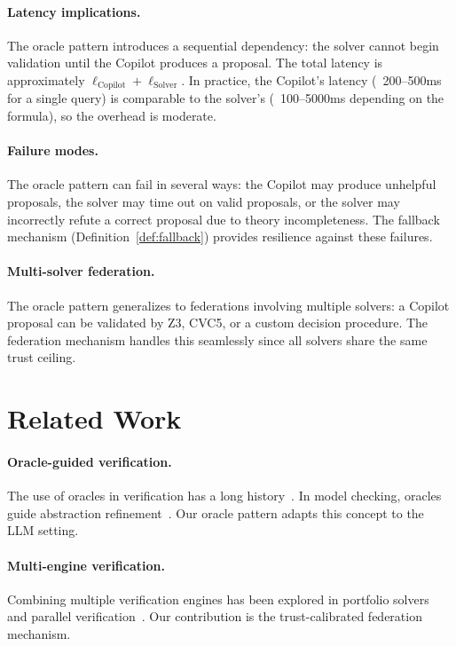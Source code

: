 \documentclass[11pt]{article}
\begin{document}
\paragraph{Latency implications.}
The oracle pattern introduces a sequential dependency: the solver
cannot begin validation until the Copilot produces a proposal.
The total latency is approximately $\ell_{\mathrm{Copilot}} +
\ell_{\mathrm{Solver}}$.  In practice, the Copilot's latency
(~200--500ms for a single query) is comparable to the solver's
(~100--5000ms depending on the formula), so the overhead is
moderate.

\paragraph{Failure modes.}
The oracle pattern can fail in several ways: the Copilot may
produce unhelpful proposals, the solver may time out on valid
proposals, or the solver may incorrectly refute a correct proposal
due to theory incompleteness.  The fallback mechanism
(Definition~\ref{def:fallback}) provides resilience against
these failures.

\paragraph{Multi-solver federation.}
The oracle pattern generalizes to federations involving multiple
solvers: a Copilot proposal can be validated by Z3, CVC5, or a
custom decision procedure.  The federation mechanism handles this
seamlessly since all solvers share the same trust ceiling.

\section{Related Work}
\label{sec:related}

\paragraph{Oracle-guided verification.}
The use of oracles in verification has a long
history~\cite{hoare1969axiomatic,floyd1967assigning}.
In model checking, oracles guide abstraction
refinement~\cite{clarke2003counterexample}.  Our oracle pattern
adapts this concept to the LLM setting.

\paragraph{Multi-engine verification.}
Combining multiple verification engines has been explored in
portfolio solvers~\cite{xu2008satzilla} and parallel
verification~\cite{wintersteiger2009portfolio}.  Our
contribution is the trust-calibrated federation mechanism.
\end{document}
